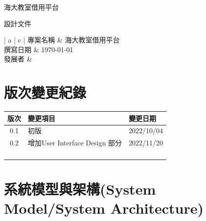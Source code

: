 \documentclass{article}
\begin{document}
\begin{titlepage}
	\centering

	{\huge 海大教室借用平台}

	\vfill

	{\huge 設計文件}

	\vfill

	\begin{Large}
		\begin{center}
			\begin{tabular}{| a | c |}
				\hline
				專案名稱 & 海大教室借用平台               \\ \hline
				撰寫日期 & \today                 \\ \hline
				發展者  &  \\ \hline
			\end{tabular}
		\end{center}
	\end{Large}
\end{titlepage}


\section*{版次變更紀錄}

\begin{tabularx}{\textwidth}{| c | X | X |}
	\rowcolor{LightGray}
	\hline
	版次  & 變更項目 & 變更日期       \\ \hline
	0.1 & 初版   & 2022/10/04 \\ \hline
	0.2 & 增加User Interface Design 部分& 2022/11/20   \\ \hline
	    &      &            \\ \hline
	    &      &            \\ \hline
	    &      &            \\ \hline
	    &      &            \\ \hline
\end{tabularx}

\newpage

\begin{center}
	\tableofcontents
\end{center}

\newpage

\section[系統模型與架構(SYSTEM MODEL/SYSTEM ARCHITECTURE)]{系統模型與架構(System Model/System Architecture)}
\end{document}
